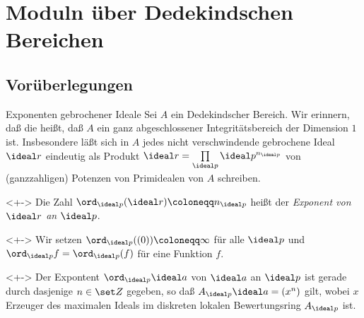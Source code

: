 \section{Moduln über Dedekindschen Bereichen}

\subsection{Vorüberlegungen}


\begin{frame}{Exponenten gebrochener Ideale}
	Sei \(A\) ein Dedekindscher Bereich. Wir erinnern, daß die heißt, daß \(A\) ein ganz abgeschlossener
	Integritätsbereich der Dimension \(1\) ist. Insbesondere läßt sich in \(A\) jedes nicht verschwindende
	gebrochene Ideal \(\ideal r\) eindeutig als Produkt
	\(\ideal r = \prod\limits_{\ideal p} \ideal p^{n_{\ideal p}}\)
	von (ganzzahligen) Potenzen von Primidealen von \(A\) schreiben.
	\begin{definition}<+->
		Die Zahl \(\ord_{\ideal p}(\ideal r) \coloneqq n_{\ideal p}\) heißt der \emph{Exponent von \(\ideal r\) an
		\(\ideal p\)}.
	\end{definition}
	\begin{visibleenv}<+->
		Wir setzen \(\ord_{\ideal p}((0)) \coloneqq \infty\) für alle \(\ideal p\) und
		\(\ord_{\ideal p} f = \ord_{\ideal p}(f)\) für eine Funktion \(f\).
	\end{visibleenv}
	\begin{remark}<+->
		Der Expontent \(\ord_{\ideal p} \ideal a\) von \(\ideal a\) an \(\ideal p\) ist
		gerade durch dasjenige \(n \in \set Z\) gegeben, so daß \(A_{\ideal p} \ideal a = (x^n)\)
		gilt, wobei \(x\) Erzeuger des maximalen Ideals im diskreten lokalen Bewertungsring \(A_{\ideal p}\) ist.
	\end{remark}
\end{frame}

